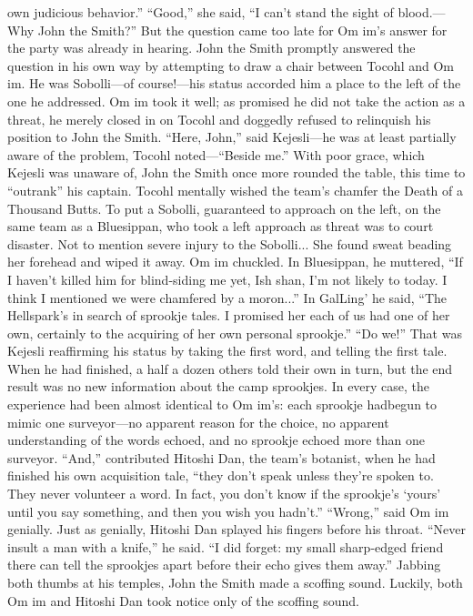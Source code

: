 \documentclass[9pt]{article}
\begin{document}
own judicious behavior.”
“Good,” she said, “I can’t stand the sight of blood.—Why John the Smith?” But the question came
too late for Om im’s answer for the party was already in hearing.
John the Smith promptly answered the question in his own way by attempting to draw a chair
between Tocohl and Om im. He was Sobolli—of course!—his status accorded him a place to the left of
the one he addressed. Om im took it well; as promised he did not take the action as a threat, he merely
closed in on Tocohl and doggedly refused to relinquish his position to John the Smith.
“Here, John,” said Kejesli—he was at least partially aware of the problem, Tocohl noted—“Beside
me.” With poor grace, which Kejesli was unaware of, John the Smith once more rounded the table, this
time to “outrank” his captain.
Tocohl mentally wished the team’s chamfer the Death of a Thousand Butts. To put a Sobolli,
guaranteed to approach on the left, on the same team as a Bluesippan, who took a left approach as
threat was to court disaster. Not to mention severe injury to the Sobolli... She found sweat beading her
forehead and wiped it away.
Om im chuckled. In Bluesippan, he muttered, “If I haven’t killed him for blind-siding me yet, Ish
shan, I’m not likely to today. I think I mentioned we were chamfered by a moron...” In GalLing’ he said,
“The Hellspark’s in search of sprookje tales. I promised her each of us had one of her own, certainly to
the acquiring of her own personal sprookje.”
“Do we!”
That was Kejesli reaffirming his status by taking the first word, and telling the first tale. When he had
finished, a half a dozen others told their own in turn, but the end result was no new information about the
camp sprookjes. In every case, the experience had been almost identical to Om im’s: each sprookje hadbegun to mimic one surveyor—no apparent reason for the choice, no apparent understanding of the
words echoed, and no sprookje echoed more than one surveyor.
“And,” contributed Hitoshi Dan, the team’s botanist, when he had finished his own acquisition tale,
“they don’t speak unless they’re spoken to. They never volunteer a word. In fact, you don’t know if the
sprookje’s ‘yours’ until you say something, and then you wish you hadn’t.”
“Wrong,” said Om im genially.
Just as genially, Hitoshi Dan splayed his fingers before his throat. “Never insult a man with a knife,”
he said. “I did forget: my small sharp-edged friend there can tell the sprookjes apart before their echo
gives them away.”
Jabbing both thumbs at his temples, John the Smith made a scoffing sound. Luckily, both Om im and
Hitoshi Dan took notice only of the scoffing sound.
\end{document}
